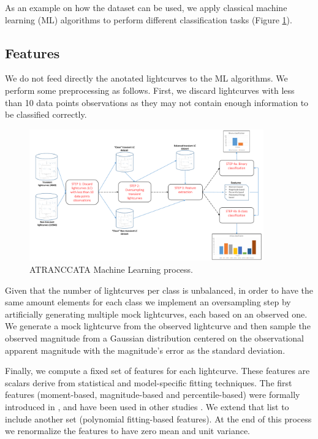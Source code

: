 \documentclass[a4paper,fleqn,usenatbib]{mnras}
\begin{document}
As an example on how the dataset can be used, we apply classical
machine learning (ML) algorithms to perform different classification tasks (Figure \ref{fig:ML}).


\subsection{Features}

We do not feed directly the anotated lightcurves to the ML algorithms.
We perform some preprocessing as follows.
First, we discard lightcurves with less than 10 data points
observations as they may not contain enough information to be
classified correctly.

\begin{figure}
	\includegraphics[width=0.9\textwidth]{ML.pdf}
  \caption{ATRANCCATA Machine Learning process.}
  \label{fig:ML}
\end{figure} 


Given that the number of lightcurves per class is unbalanced, 
in order to have the same amount elements for each class we implement an
oversampling step by artificially generating multiple mock lightcurves,
each based on an observed one. 
We generate a mock lightcurve from the observed lightcurve and 
then sample the observed magnitude from a Gaussian distribution
centered on the observational apparent magnitude with the magnitude's
error as the standard deviation. 


Finally, we compute a fixed set of features for each lightcurve. 
These features are scalars derive from statistical and model-specific
fitting techniques. 
The first features (moment-based, magnitude-based and
percentile-based) were formally introduced in 
\cite{1101.1959}, and have been used in other studies \citep{1603.00882,1601.03931}.  
We extend that list to include another set (polynomial fitting-based features). 
At the end of this process we renormalize the features to have zero
mean and unit variance.  
\end{document}
